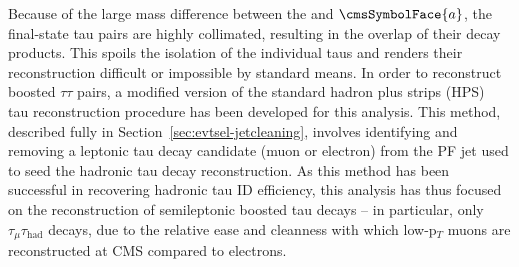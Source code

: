 Because of the large mass difference between the \PH and $\cmsSymbolFace{a}$, the final-state tau pairs are highly collimated, resulting in the overlap of their decay products. This spoils the isolation of the individual taus and renders their reconstruction difficult or impossible by standard means. In order to reconstruct boosted $\tau\tau$ pairs, a modified version of the standard hadron plus strips (HPS)~\cite{CMS:2011msa} tau reconstruction procedure has been developed for this analysis. This method, described fully in Section~\ref{sec:evtsel-jetcleaning}, involves identifying and removing a leptonic tau decay candidate (muon or electron) from the PF jet used to seed the hadronic tau decay reconstruction. As this method has been successful in recovering hadronic tau ID efficiency, this analysis has thus focused on the reconstruction of semileptonic boosted tau decays -- in particular, only $\tau_{\mu}\tau_{\text{had}}$ decays, due to the relative ease and cleanness with which low-p$_T$ muons are reconstructed at CMS compared to electrons.

